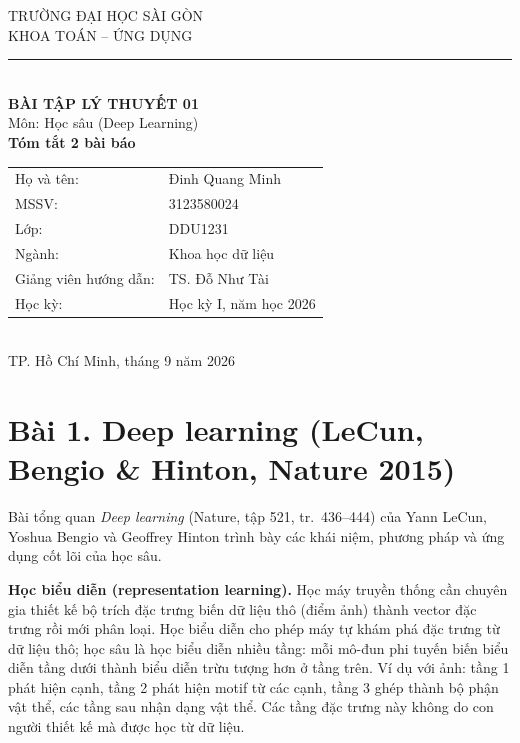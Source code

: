 \documentclass[a4paper,12pt]{article}
\begin{document}
\begin{center}
\large TRƯỜNG ĐẠI HỌC SÀI GÒN \\
\large KHOA TOÁN -- ỨNG DỤNG \\[0.3cm]
\rule{12cm}{1.5pt} \\[0.8cm]

\Large \textbf{BÀI TẬP LÝ THUYẾT 01} \\[0.4cm]
\large Môn: Học sâu (Deep Learning) \\
\Large \textbf{Tóm tắt 2 bài báo} \\[1.2cm]

\begin{tabular}{ll}
Họ và tên: & Đinh Quang Minh \\
MSSV: & 3123580024 \\
Lớp: & DDU1231 \\
Ngành: & Khoa học dữ liệu \\
Giảng viên hướng dẫn: & TS. Đỗ Như Tài \\
Học kỳ: & Học kỳ I, năm học 2026 \\
\end{tabular}\\[1.5cm]

TP. Hồ Chí Minh, tháng 9 năm 2026 \\
\end{center}

\newpage

\section*{Bài 1. Deep learning (LeCun, Bengio \& Hinton, Nature 2015)}

Bài tổng quan \textit{Deep learning} (Nature, tập 521, tr.~436--444) của Yann LeCun, Yoshua Bengio và Geoffrey Hinton trình bày các khái niệm, phương pháp và ứng dụng cốt lõi của học sâu.

\textbf{Học biểu diễn (representation learning).} Học máy truyền thống cần chuyên gia thiết kế bộ trích đặc trưng biến dữ liệu thô (điểm ảnh) thành vector đặc trưng rồi mới phân loại. Học biểu diễn cho phép máy tự khám phá đặc trưng từ dữ liệu thô; học sâu là học biểu diễn nhiều tầng: mỗi mô-đun phi tuyến biến biểu diễn tầng dưới thành biểu diễn trừu tượng hơn ở tầng trên. Ví dụ với ảnh: tầng 1 phát hiện cạnh, tầng 2 phát hiện motif từ các cạnh, tầng 3 ghép thành bộ phận vật thể, các tầng sau nhận dạng vật thể. Các tầng đặc trưng này không do con người thiết kế mà được học từ dữ liệu.
\end{document}
